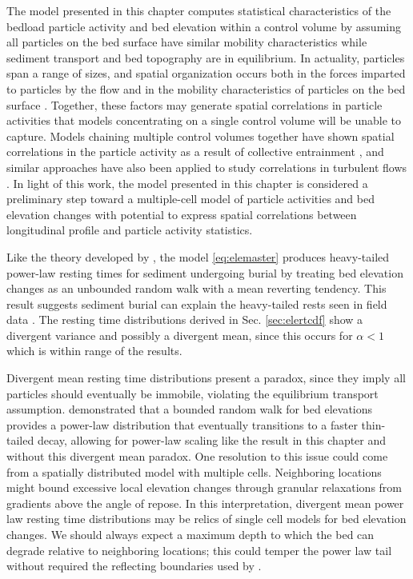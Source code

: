 The model presented in this chapter computes statistical characteristics of the bedload particle activity and bed elevation within a control volume by assuming all particles on the bed surface have similar mobility characteristics while sediment transport and bed topography are in equilibrium. In actuality, particles span a range of sizes, and spatial organization occurs both in the forces imparted to particles by the flow \citep{Shih2017,Amir2014} and in the mobility characteristics of particles on the bed surface \citep{Charru2004, Hassan2008, Nelson2014}.
Together, these factors may generate spatial correlations in particle activities that models concentrating on a single control volume will be unable to capture. 
Models chaining multiple control volumes together have shown spatial correlations in the particle activity as a result of collective entrainment \citep{Heyman2014, Ancey2015}, and similar approaches have also been applied to study correlations in turbulent flows \citep{Gardiner1983}. In light of this work, the model presented in this chapter is considered a preliminary step toward a multiple-cell model of particle activities and bed elevation changes with potential to express spatial correlations between longitudinal profile and particle activity statistics.

Like the theory developed by \citet{Martin2014}, the model \ref{eq:elemaster} produces heavy-tailed power-law resting times for sediment undergoing burial by treating bed elevation changes as an unbounded random walk with a mean reverting tendency.
This result suggests sediment burial can explain the heavy-tailed rests seen in field data \citep{Olinde2015,Bradley2017,Pretzlav2016a}. 
The resting time distributions derived in Sec. \ref{sec:elertcdf} show a divergent variance and possibly a divergent mean, since this occurs for $\alpha < 1$ \citep{Sornette2006} which is within range of the results.

Divergent mean resting time distributions present a paradox, since they imply all particles should eventually be immobile, violating the equilibrium transport assumption.
\citet{Voepel2013} demonstrated that a bounded random walk for bed elevations provides a power-law distribution that eventually transitions to a faster thin-tailed decay, allowing for power-law scaling like the result in this chapter and \citet{Martin2014} without this divergent mean paradox. 
One resolution to this issue could come from a spatially distributed model with multiple cells.
Neighboring locations might bound excessive local elevation changes through granular relaxations from gradients above the angle of repose.
In this interpretation, divergent mean power law resting time distributions may be relics of single cell models for bed elevation changes.
We should always expect a maximum depth to which the bed can degrade relative to neighboring locations; this could temper the power law tail without required the reflecting boundaries used by \citet{Voepel2013}.

